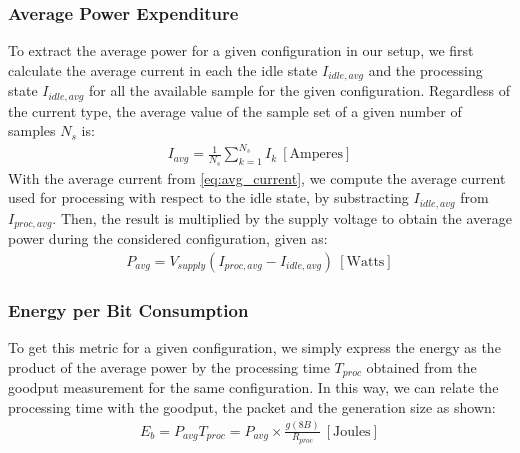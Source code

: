 \subsubsection{Average Power Expenditure}
To extract the average power for a given configuration in our setup, we
first calculate the average current in each the idle state $I_{idle,avg}$
and the processing state $I_{idle,avg}$ for all the available sample for
the given configuration. Regardless of the current type, the average value
of the sample set of a given number of samples $N_s$ is:
%
\begin{align} \label{eq:avg_current}
I_{avg} = \frac{1}{N_s}\sum_{k=1}^{N_s} I_{k}  ~[\mathrm{Amperes}]
\end{align}
%
With the average current from \eqref{eq:avg_current}, we compute the average
current used for processing with respect to the idle state, by substracting
$I_{idle,avg}$ from $I_{proc,avg}$. Then, the result is multiplied by the
supply voltage to obtain the average power during the considered configuration,
given as:
%
\begin{align} \label{eq:avg_power}
P_{avg} = V_{supply}(I_{proc,avg} - I_{idle,avg}) ~[\mathrm{Watts}]
\end{align}
%
\subsubsection{Energy per Bit Consumption}
To get this metric for a given configuration, we simply express the energy
as the product of the average power by the processing time $T_{proc}$ obtained
from the goodput measurement for the same configuration. In this way, we can
relate the processing time with the goodput, the packet and the generation size
as shown:
%
\begin{align} \label{eq:goodput}
E_b = P_{avg} T_{proc} = P_{avg} \times \frac{g(8B)}{R_{proc}} ~[\mathrm{Joules}]
\end{align}
%
